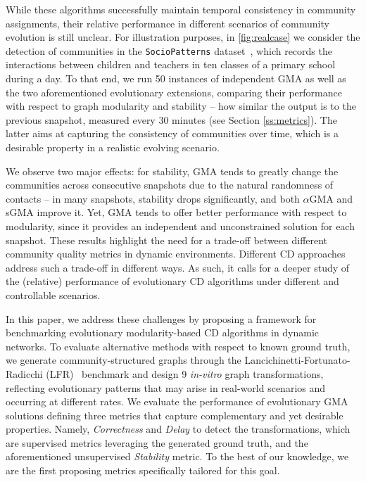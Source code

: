 \documentclass[letterpaper]{article}
\begin{document}
While these algorithms successfully maintain temporal consistency in community assignments, their relative performance in different scenarios of community evolution is still unclear. For illustration purposes, in \cref{fig:realcase} we consider the detection of communities in the  \texttt{SocioPatterns} dataset~\cite{stehle2011dataset}, which records the interactions between children and teachers in ten classes of a primary school during a day. To that end, we run 50 instances of independent GMA as well as the two aforementioned evolutionary extensions, comparing their performance with respect to graph modularity and stability -- \ie how similar the output is to the previous snapshot, measured every 30 minutes (see Section \ref{ss:metrics}). The latter aims at capturing the consistency of communities over time, which is a desirable property in a realistic evolving scenario.

We observe two major effects: for stability, GMA tends to greatly change the communities across consecutive snapshots due to the natural randomness of contacts -- \ie in many snapshots, stability drops significantly, and both $\alpha$GMA and sGMA improve it.
Yet, GMA tends to offer better performance with respect to modularity, since it provides an independent and unconstrained solution for each snapshot. 
These results highlight the need for a trade-off between different community quality metrics in dynamic environments. Different CD approaches address such a trade-off in different ways. 
As such, it calls for a deeper study of the (relative) performance of evolutionary CD algorithms under different and controllable scenarios.

In this paper, we address these challenges by proposing a framework for benchmarking evolutionary modularity-based CD algorithms in dynamic networks. To evaluate alternative methods with respect to known ground truth, we generate community-structured graphs through the Lancichinetti-Fortunato-Radicchi (LFR)~\cite{lancichinetti2008benchmark} benchmark and design 9 \emph{in-vitro} graph transformations, reflecting evolutionary patterns that may arise in real-world scenarios and occurring at different rates.  
We evaluate the performance of evolutionary GMA solutions defining three metrics that capture complementary and yet desirable properties. Namely, \emph{Correctness} and \emph{Delay} to detect the transformations, which are supervised metrics leveraging the generated ground truth, and the aforementioned unsupervised \emph{Stability} metric. To the best of our knowledge, we are the first proposing metrics specifically tailored for this goal.
\end{document}
